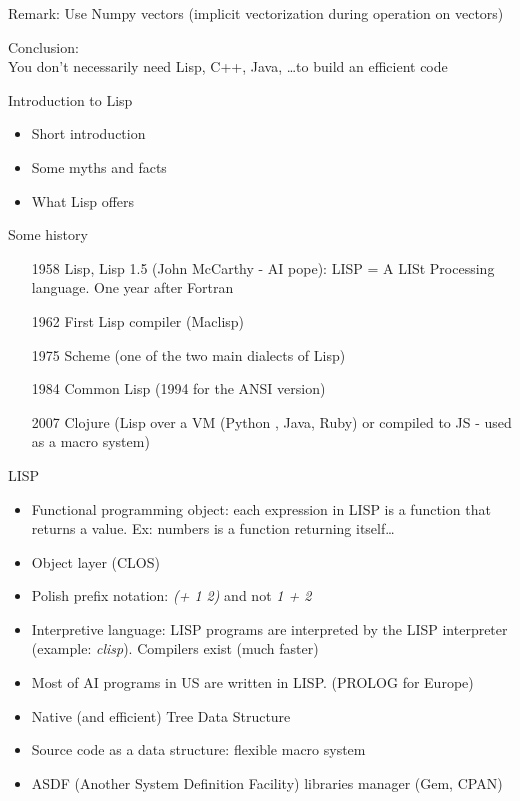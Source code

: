 \documentclass[english,serif,mathserif,usenames,dvipsnames]{beamer}
\begin{document}
\begin{frame}{Remark: Use Numpy vectors (implicit vectorization during operation on vectors)}
	
    Conclusion:\\
    You don't necessarily need Lisp, C++, Java, \dots to build an efficient code

\end{frame}

\begin{frame}{Introduction to Lisp}
	\begin{itemize}[<+->]
    \item Short introduction
    \item Some myths and facts
    \item What Lisp offers
    \end{itemize}
\end{frame}

\begin{frame}{Some history}
	\begin{itemize}[<+->]
    \item[1958] Lisp, Lisp 1.5 (John McCarthy - AI pope): LISP = A LISt Processing language. One year after Fortran 
    \item[1962] First Lisp compiler (Maclisp)
    \item[1975] Scheme (one of the two main dialects of Lisp)
    \item[1984] Common Lisp (1994 for the ANSI version)
    \item[2007] Clojure (Lisp over a VM (Python , Java, Ruby) or compiled to JS - used as a macro system)
    \end{itemize}
\end{frame}

\begin{frame}{LISP}
	\begin{itemize}[<+->]
	\item Functional programming object: each expression in LISP is a function that returns a value. Ex: numbers is a function returning itself\dots
	\item Object layer (CLOS)
	\item Polish prefix notation: \emph{(+ 1 2)} and not \emph{1 + 2}
	\item Interpretive language: LISP programs are interpreted by the LISP interpreter (example: \emph{clisp}). Compilers exist (much faster)
	\item Most of AI programs in US are written in LISP. (PROLOG for Europe)
	\item Native (and efficient) Tree Data Structure
	\item Source code as a data structure: flexible macro system
	\item ASDF (Another System Definition Facility) libraries manager (Gem, CPAN)
    \end{itemize}
\end{frame}
\end{document}
